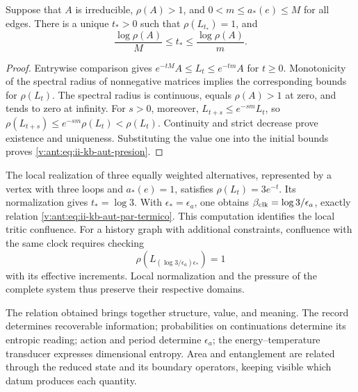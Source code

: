 \begin{proposition}
Suppose that \(A\) is irreducible, \(\rho(A)>1\), and
\(0<m\leq a_*(e)\leq M\) for all edges. There is a unique
\(t_*>0\) such that \(\rho(L_{t_*})=1\), and
\begin{equation}
 \frac{\log\rho(A)}{M}\leq t_*\leq
 \frac{\log\rho(A)}{m}.
 \label{v:ant:eq:ii-kb-aut-presion}
\end{equation}
\end{proposition}
\begin{proof}
Entrywise comparison gives
\(e^{-tM}A\leq L_t\leq e^{-tm}A\) for \(t\geq0\).
Monotonicity of the spectral radius of nonnegative matrices implies
the corresponding bounds for \(\rho(L_t)\). The spectral radius
is continuous, equals \(\rho(A)>1\) at zero, and tends to zero at infinity.
For \(s>0\), moreover,
\(L_{t+s}\leq e^{-sm}L_t\), so
\(\rho(L_{t+s})\leq e^{-sm}\rho(L_t)<\rho(L_t)\).
Continuity and strict decrease prove existence and
uniqueness. Substituting the value one into the initial bounds proves
\eqref{v:ant:eq:ii-kb-aut-presion}.
\end{proof}

The local realization of three equally weighted alternatives, represented
by a vertex with three loops and \(a_*(e)=1\), satisfies
\(\rho(L_t)=3e^{-t}\). Its normalization gives \(t_*=\log3\).
With \(\epsilon_*=\epsilon_a\), one obtains
\(\beta_{\rm clk}=\log3/\epsilon_a\), exactly relation
\eqref{v:ant:eq:ii-kb-aut-par-termico}. This computation identifies the
local tritic confluence. For a history graph with additional
constraints, confluence with the same clock requires checking
\[
 \rho\!\left(L_{(\log3/\epsilon_a)\epsilon_*}\right)=1
\]
with its effective increments. Local normalization and the pressure
of the complete system thus preserve their respective domains.

The relation obtained brings together structure, value, and meaning. The record
determines recoverable information; probabilities on
continuations determine its entropic reading; action and period
determine \(\epsilon_a\); the energy--temperature transducer
expresses dimensional entropy. Area and entanglement are
related through the reduced state and its boundary operators,
keeping visible which datum produces each quantity.
